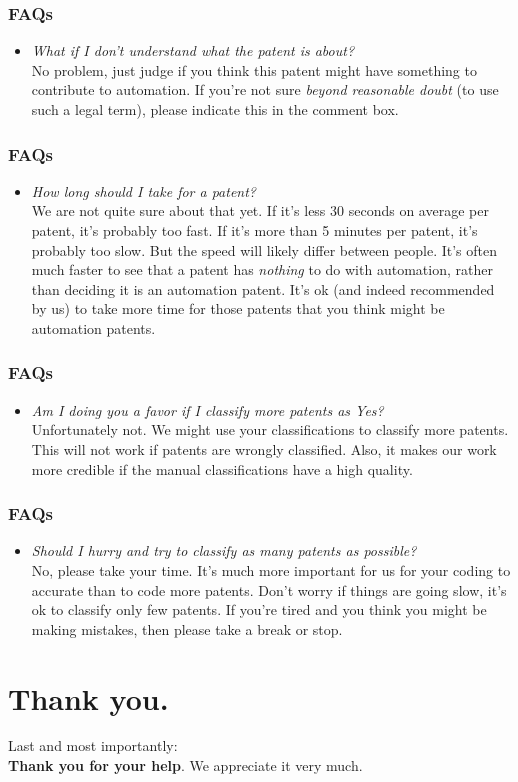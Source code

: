 \documentclass[10pt]{beamer}
\begin{document}
\begin{frame}\frametitle{FAQs}
	\begin{itemize}	
	\item \textit{What if I don't understand what the patent is about?}\\[0.1cm]
	No problem, just judge if you think this patent might have something to contribute to automation. If you're not sure \textit{beyond reasonable doubt} (to use such a legal term), please indicate this in the comment box.
	\end{itemize}
\end{frame}
	
\begin{frame}\frametitle{FAQs}
	\begin{itemize}	
	\item \textit{How long should I take for a patent?}\\[0.1cm]
	We are not quite sure about that yet. If it's less 30 seconds on average per patent, it's probably too fast. If it's more than 5 minutes per patent, it's probably too slow. But the speed will likely differ between people. It's often much faster to see that a patent has \textit{nothing} to do with automation, rather than deciding it is an automation patent. It's ok (and indeed recommended by us) to take more time for those patents that you think might be automation patents.
	\end{itemize}
\end{frame}

\begin{frame}\frametitle{FAQs}
	\begin{itemize}	
	\item \textit{Am I doing you a favor if I classify more patents as Yes?}\\[0.1cm]
	Unfortunately not. We might use your classifications to classify more patents. This will not work if patents are wrongly classified. Also, it makes our work more credible if the manual classifications have a high quality.
	\end{itemize}
\end{frame}
	
\begin{frame}\frametitle{FAQs}
	\begin{itemize}	
	\item \textit{Should I hurry and try to classify as many patents as possible?}\\[0.1cm]
	No, please take your time. It's much more important for us for your coding to accurate than to code more patents. Don't worry if things are going slow, it's ok to classify only few patents. If you're tired and you think you might be making mistakes, then please take a break or stop.
	\end{itemize}
\end{frame}



\section{Thank you.}
\setcounter{subsection}{1} %
\begin{frame}
	Last and most importantly: \\[0.2cm]
	\textbf{Thank you for your help}. We appreciate it very much.
\end{frame}
\end{document}
